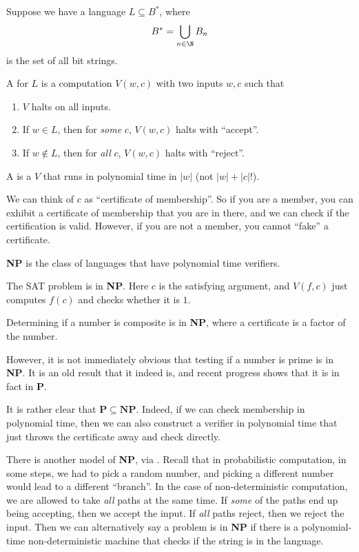 \documentclass[a4paper]{article}
\begin{document}
\begin{defi}[Verifier]
  Suppose we have a language $L \subseteq B^*$, where
  \[
    B^* = \bigcup_{n \in \N} B_n
  \]
  is the set of all bit strings.

  A  for $L$ is a computation $V(w, c)$ with two inputs $w, c$ such that
  \begin{enumerate}
    \item $V$ halts on all inputs.
    \item If $w \in L$, then for \emph{some} $c$, $V(w, c)$ halts with ``accept''.
    \item If $w \not\in L$, then for \emph{all} $c$, $V(w, c)$ halts with ``reject''.
  \end{enumerate}
  A  is a $V$ that runs in polynomial time in $|w|$ (not $|w| + |c|!$).
\end{defi}
We can think of $c$ as ``certificate of membership''. So if you are a member, you can exhibit a certificate of membership that you are in there, and we can check if the certification is valid. However, if you are not a member, you cannot ``fake'' a certificate.

\begin{defi}
  \textbf{NP} is the class of languages that have polynomial time verifiers.
\end{defi}

\begin{eg}
  The SAT problem is in \textbf{NP}. Here $c$ is the satisfying argument, and $V(f, c)$ just computes $f(c)$ and checks whether it is $1$.
\end{eg}

\begin{eg}
  Determining if a number is composite is in \textbf{NP}, where a certificate is a factor of the number.
\end{eg}
However, it is not immediately obvious that testing if a number is prime is in \textbf{NP}. It is an old result that it indeed is, and recent progress shows that it is in fact in \textbf{P}.

It is rather clear that $\mathbf{P} \subseteq \mathbf{NP}$. Indeed, if we can check membership in polynomial time, then we can also construct a verifier in polynomial time that just throws the certificate away and check directly.

There is another model of \textbf{NP}, via . Recall that in probabilistic computation, in some steps, we had to pick a random number, and picking a different number would lead to a different ``branch''. In the case of non-deterministic computation, we are allowed to take \emph{all} paths at the same time. If \emph{some} of the paths end up being accepting, then we accept the input. If \emph{all} paths reject, then we reject the input. Then we can alternatively say a problem is in \textbf{NP} if there is a polynomial-time non-deterministic machine that checks if the string is in the language.
\end{document}
